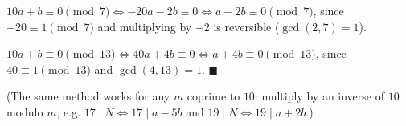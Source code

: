 $10a+b\equiv0\pmod7\iff-20a-2b\equiv0\iff a-2b\equiv0\pmod7$, since $-20\equiv1\pmod7$ and multiplying by $-2$ is reversible ($\gcd(2,7)=1$).

$10a+b\equiv0\pmod{13}\iff40a+4b\equiv0\iff a+4b\equiv0\pmod{13}$, since $40\equiv1\pmod{13}$ and $\gcd(4,13)=1$. $\blacksquare$

(The same method works for any $m$ coprime to $10$: multiply by an inverse of $10$ modulo $m$, e.g. $17\mid N\iff17\mid a-5b$ and $19\mid N\iff19\mid a+2b$.)
